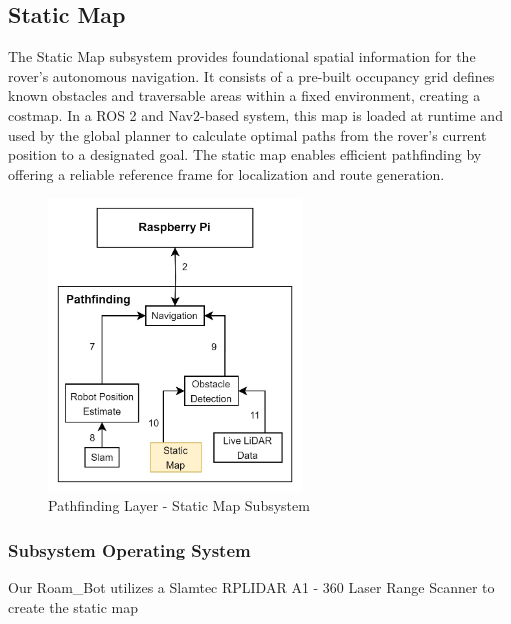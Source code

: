 \newpage

\subsection{Static Map}
The Static Map subsystem provides foundational spatial information for the rover's autonomous navigation. It consists of a pre-built occupancy grid defines known obstacles and traversable areas within a fixed environment, creating a costmap. In a ROS 2 and Nav2-based system, this map is loaded at runtime and used by the global planner to calculate optimal paths from the rover's current position to a designated goal. The static map enables efficient pathfinding by offering a reliable reference frame for localization and route generation.

\begin{figure}[h!]
	\centering
 	\includegraphics[width=0.60\textwidth]{images/pathfinding/staticmap.jpg}
 \caption{Pathfinding Layer - Static Map Subsystem}
\end{figure}


\subsubsection{Subsystem Operating System}
Our Roam\_Bot utilizes a Slamtec RPLIDAR A1 - 360 Laser Range Scanner to create the static map

